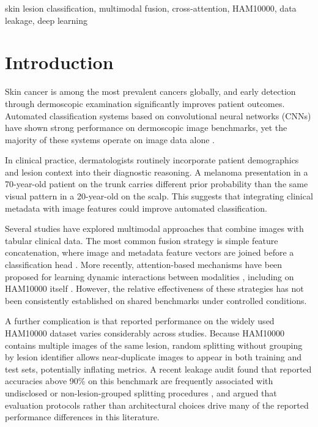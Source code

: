 \documentclass[conference]{IEEEtran}
\begin{document}
\begin{IEEEkeywords}
skin lesion classification, multimodal fusion, cross-attention, HAM10000, data leakage, deep learning
\end{IEEEkeywords}

\section{Introduction}
\label{sec:introduction}

Skin cancer is among the most prevalent cancers globally, and early detection through dermoscopic examination significantly improves patient outcomes. Automated classification systems based on convolutional neural networks (CNNs) have shown strong performance on dermoscopic image benchmarks, yet the majority of these systems operate on image data alone \citep{tschandl2018ham10000}.

In clinical practice, dermatologists routinely incorporate patient demographics and lesion context into their diagnostic reasoning. A melanoma presentation in a 70-year-old patient on the trunk carries different prior probability than the same visual pattern in a 20-year-old on the scalp. This suggests that integrating clinical metadata with image features could improve automated classification.

Several studies have explored multimodal approaches that combine images with tabular clinical data. The most common fusion strategy is simple feature concatenation, where image and metadata feature vectors are joined before a classification head \citep{pacheco2021attention}. More recently, attention-based mechanisms have been proposed for learning dynamic interactions between modalities \citep{das2025comparative, alfahdawi2025novel}, including on HAM10000 itself \citep{adebiyi2024accurate}. However, the relative effectiveness of these strategies has not been consistently established on shared benchmarks under controlled conditions.

A further complication is that reported performance on the widely used HAM10000 dataset varies considerably across studies. Because HAM10000 contains multiple images of the same lesion, random splitting without grouping by lesion identifier allows near-duplicate images to appear in both training and test sets, potentially inflating metrics. A recent leakage audit found that reported accuracies above 90\% on this benchmark are frequently associated with undisclosed or non-lesion-grouped splitting procedures \citep{jamaludin2026quantum}, and argued that evaluation protocols rather than architectural choices drive many of the reported performance differences in this literature.
\end{document}
